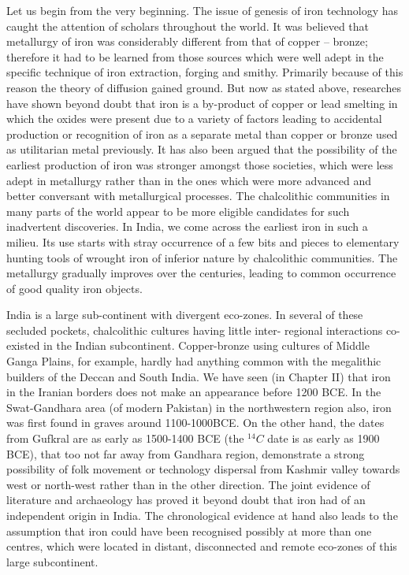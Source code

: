 Let us begin from the very beginning. The issue of genesis of iron technology has caught the attention of scholars throughout the world. It was believed that metallurgy of iron was considerably different from that of copper – bronze; therefore it had to be learned from those sources which were well adept in the specific technique of iron extraction, forging and smithy. Primarily because of this reason the theory of diffusion gained ground. But now as stated above, researches have shown beyond doubt that iron is a by-product of copper or lead smelting in which the oxides were present due to a variety of factors leading to accidental production or recognition of iron as a separate metal than copper or bronze used as utilitarian metal previously. It has also been argued that the possibility of the earliest production of iron was stronger amongst those societies, which were less adept in metallurgy rather than in the ones which were more advanced and better conversant with metallurgical processes. The chalcolithic communities in many parts of the world appear to be more eligible candidates for such inadvertent discoveries. In India, we come across the earliest iron in such a milieu. Its use starts with stray occurrence of a few bits and pieces to elementary hunting tools of wrought iron of inferior nature by chalcolithic communities. The metallurgy gradually improves over the centuries, leading to common occurrence of good quality iron objects. 

India is a large sub-continent with divergent eco-zones. In several of these secluded pockets, chalcolithic cultures having little inter- regional interactions co-existed in the Indian subcontinent. Copper-bronze using cultures of Middle Ganga Plains, for example, hardly had anything common with the megalithic builders of the Deccan and South India. We have seen (in Chapter II) that iron in the Iranian borders does not make an appearance before 1200 BCE. In the Swat-Gandhara area (of modern Pakistan) in the northwestern region also, iron was first found in graves around 1100-1000BCE. On the other hand, the dates from Gufkral are as early as 1500-1400 BCE (the ${}^{14}C$ date is as early as 1900 BCE), that too not far away from Gandhara region, demonstrate a strong possibility of folk movement or technology dispersal from Kashmir valley towards west or north-west rather than in the other direction. The joint evidence of literature and archaeology has proved it beyond doubt that iron had of an independent origin in India. The chronological evidence at hand also leads to the assumption that iron could have been recognised possibly at more than one centres, which were located in distant, disconnected and remote eco-zones of this large subcontinent. 

